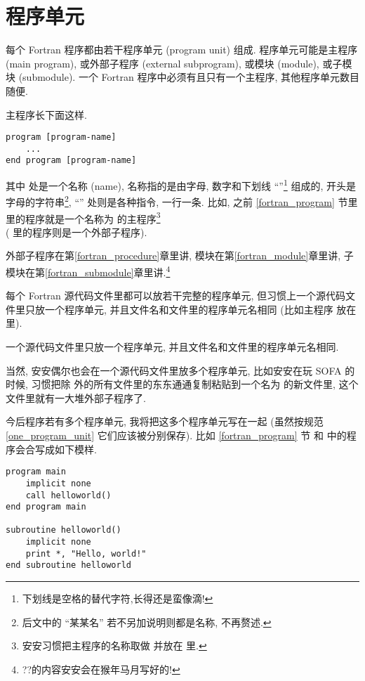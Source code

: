 \section{程序单元}\label{program_unit}

每个 Fortran 程序都由若干程序单元 (program unit) 组成. 程序单元可能是主程序 (main program), 或外部子程序 (external subprogram), 或模块 (module), 或子模块 (submodule). 一个 Fortran 程序中必须有且只有一个主程序, 其他程序单元数目随便.

主程序长下面这样.
\begin{lstlisting}
program [program-name]
    ...
end program [program-name]
\end{lstlisting}
其中  处是一个名称 (name), 名称指的是由字母, 数字和下划线 ``\ttt{\_{}}''\footnote{
    下划线是空格的替代字符,长得还是蛮像滴!
} 组成的, 开头是字母的字符串\footnote{后文中的 ``某某名'' 若不另加说明则都是名称, 不再赘述.}, ``'' 处则是各种指令, 一行一条. 比如, 之前 \ref{fortran_program} 节里  里的程序就是一个名称为  的主程序\footnote{安安习惯把主程序的名称取做  并放在  里.} \\( 里的程序则是一个外部子程序).

外部子程序在第\ref{fortran_procedure}章里讲, 模块在第\ref{fortran_module}章里讲, 子模块在第\ref{fortran_submodule}章里讲.\footnote{??\mbox{}的内容安安会在猴年马月写好的!}

每个 Fortran 源代码文件里都可以放若干完整的程序单元, 但习惯上一个源代码文件里只放一个程序单元, 并且文件名和文件里的程序单元名相同 (比如主程序  放在  里).
\begin{convention}
    一个源代码文件里只放一个程序单元, 并且文件名和文件里的程序单元名相同.\label{one_program_unit}
\end{convention}
当然, 安安偶尔也会在一个源代码文件里放多个程序单元, 比如安安在玩 SOFA 的时候, 习惯把除  外的所有文件里的东东通通复制粘贴到一个名为  的新文件里, 这个文件里就有一大堆外部子程序了.

今后程序若有多个程序单元, 我将把这多个程序单元写在一起 (虽然按规范 \ref{one_program_unit} 它们应该被分别保存). 比如 \ref{fortran_program} 节  和  中的程序会合写成如下模样.
\begin{lstlisting}
program main
    implicit none
    call helloworld()
end program main

subroutine helloworld()
    implicit none
    print *, "Hello, world!"
end subroutine helloworld
\end{lstlisting}

